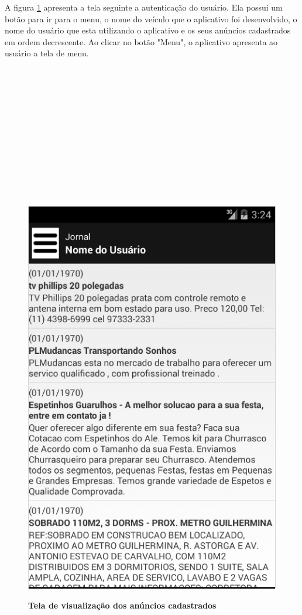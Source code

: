 \documentclass[
	12pt,				%
	openright,			%
	oneside,			%
	a4paper,			%
	chapter=TITLE,		%
	section=TITLE,		%
	english,			%
	french,				%
	spanish,			%
	brazil				%
	]{abntex2}
\begin{document}
A figura \ref{fig-android-meus-anuncios} apresenta a tela seguinte a autenticação do usuário. Ela possui um botão para ir para o menu, o nome do veículo que o aplicativo foi desenvolvido, o nome do usuário que esta utilizando o aplicativo e os seus anúncios cadastrados em ordem decrescente. Ao clicar no botão "Menu", o aplicativo apresenta ao usuário a tela de menu. \\ \\ \\ \\ \\ \\ \\ \\ \\ \\ \\ \\ \\

\begin{figure}[h]
	\begin{center}
		\caption{
			\textbf{Tela de visualização dos anúncios cadastrados}
		}\label{fig-android-meus-anuncios}
		\includegraphics [scale=0.6]{imagens/android-meus-anuncios.png}
		\label{fig-android-meus-anuncios}
	\end{center}
\end{figure}
\end{document}
